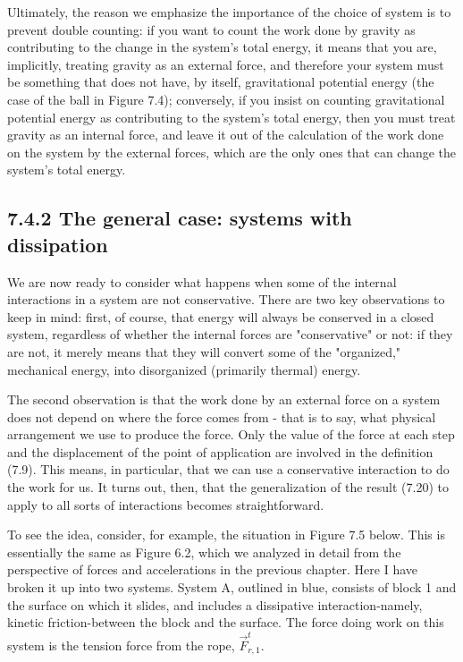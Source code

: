 \documentclass[10pt]{article}
\begin{document}
Ultimately, the reason we emphasize the importance of the choice of system is to prevent double counting: if you want to count the work done by gravity as contributing to the change in the system's total energy, it means that you are, implicitly, treating gravity as an external force, and therefore your system must be something that does not have, by itself, gravitational potential energy (the case of the ball in Figure 7.4); conversely, if you insist on counting gravitational potential energy as contributing to the system's total energy, then you must treat gravity as an internal force, and leave it out of the calculation of the work done on the system by the external forces, which are the only ones that can change the system's total energy.

\subsection*{7.4.2 The general case: systems with dissipation}
We are now ready to consider what happens when some of the internal interactions in a system are not conservative. There are two key observations to keep in mind: first, of course, that energy will always be conserved in a closed system, regardless of whether the internal forces are "conservative" or not: if they are not, it merely means that they will convert some of the "organized," mechanical energy, into disorganized (primarily thermal) energy.

The second observation is that the work done by an external force on a system does not depend on where the force comes from - that is to say, what physical arrangement we use to produce the force. Only the value of the force at each step and the displacement of the point of application are involved in the definition (7.9). This means, in particular, that we can use a conservative interaction to do the work for us. It turns out, then, that the generalization of the result (7.20) to apply to all sorts of interactions becomes straightforward.

To see the idea, consider, for example, the situation in Figure 7.5 below. This is essentially the same as Figure 6.2, which we analyzed in detail from the perspective of forces and accelerations in the previous chapter. Here I have broken it up into two systems. System A, outlined in blue, consists of block 1 and the surface on which it slides, and includes a dissipative interaction-namely, kinetic friction-between the block and the surface. The force doing work on this system is the tension force from the rope, $\vec{F}_{r, 1}^{t}$.
\end{document}
